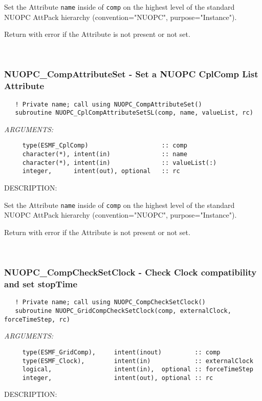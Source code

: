      Set the Attribute {\tt name} inside of {\tt comp} on the highest level
     of the standard NUOPC AttPack hierarchy (convention="NUOPC", 
     purpose="Instance").
  
     Return with error if the Attribute is not present or not set. 
 
\mbox{}\hrulefill\ 
 
\subsubsection [NUOPC\_CompAttributeSet] {NUOPC\_CompAttributeSet - Set a NUOPC CplComp List Attribute}


\begin{verbatim}   ! Private name; call using NUOPC_CompAttributeSet() 
   subroutine NUOPC_CplCompAttributeSetSL(comp, name, valueList, rc)\end{verbatim}{\em ARGUMENTS:}
\begin{verbatim}     type(ESMF_CplComp)                    :: comp
     character(*), intent(in)              :: name
     character(*), intent(in)              :: valueList(:)
     integer,      intent(out), optional   :: rc\end{verbatim}
{\sf DESCRIPTION:\\ }


     Set the Attribute {\tt name} inside of {\tt comp} on the highest level
     of the standard NUOPC AttPack hierarchy (convention="NUOPC", 
     purpose="Instance").
  
     Return with error if the Attribute is not present or not set. 
 
\mbox{}\hrulefill\ 
 
\subsubsection [NUOPC\_CompCheckSetClock] {NUOPC\_CompCheckSetClock - Check Clock compatibility and set stopTime}


\begin{verbatim}   ! Private name; call using NUOPC_CompCheckSetClock() 
   subroutine NUOPC_GridCompCheckSetClock(comp, externalClock, forceTimeStep, rc)\end{verbatim}{\em ARGUMENTS:}
\begin{verbatim}     type(ESMF_GridComp),     intent(inout)         :: comp
     type(ESMF_Clock),        intent(in)            :: externalClock
     logical,                 intent(in),  optional :: forceTimeStep
     integer,                 intent(out), optional :: rc\end{verbatim}
{\sf DESCRIPTION:\\ }


